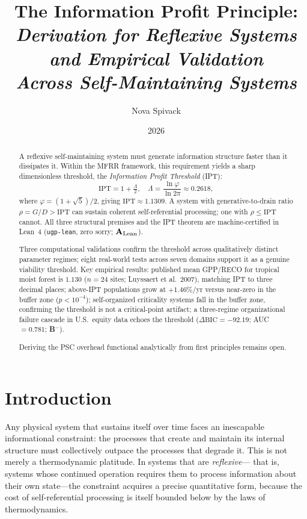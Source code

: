 \documentclass[11pt,twocolumn]{article}
\title{\bfseries The Information Profit Principle:\\
\large\itshape Derivation for Reflexive Systems and Empirical Validation\\
Across Self-Maintaining Systems}
\author{Nova Spivack}
\date{2026}
\newcommand{\CatAL}{\ensuremath{\textbf{A}_{\rm Lean}}}
\newcommand{\CatB}{\textbf{B}}
\theoremstyle{remark}
\begin{document}
\maketitle
\NovaZenodoAfterTitle

\begin{abstract}
A reflexive self-maintaining system must generate information structure faster than
it dissipates it. Within the MFRR framework, this requirement yields a sharp
dimensionless threshold, the \emph{Information Profit Threshold} (IPT):
\[
  \mathrm{IPT} = 1 + \tfrac{\Lambda}{2}, \quad
  \Lambda = \frac{\ln\varphi}{\ln 2\pi} \approx 0.2618,
\]
where $\varphi = (1+\sqrt5)/2$, giving $\mathrm{IPT} \approx 1.1309$.
A system with generative-to-drain ratio $\rho = G/D > \mathrm{IPT}$ can sustain
coherent self-referential processing; one with $\rho \leq \mathrm{IPT}$ cannot.
All three structural premises and the IPT theorem are machine-certified in Lean~4
(\texttt{ugp-lean}, zero sorry; \CatAL).

Three computational validations confirm the threshold across qualitatively distinct
parameter regimes; eight real-world tests across seven domains support it as a
genuine viability threshold. Key empirical results: published mean GPP/RECO for
tropical moist forest is $1.130$ ($n=24$ sites; Luyssaert et al.\ 2007), matching
IPT to three decimal places; above-IPT populations grow at $+1.46\%$/yr versus
near-zero in the buffer zone ($p < 10^{-4}$); self-organized criticality systems
fall in the buffer zone, confirming the threshold is not a critical-point artifact;
a three-regime organizational failure cascade in U.S.\ equity data echoes the threshold
($\Delta\mathrm{BIC} = -92.19$; AUC $= 0.781$; \CatB$^-$).

Deriving the PSC overhead functional analytically from first principles remains open.
\end{abstract}

\tableofcontents

\section{Introduction}
\label{sec:intro}

Any physical system that sustains itself over time faces an inescapable
informational constraint: the processes that create and maintain its internal
structure must collectively outpace the processes that degrade it. This is
not merely a thermodynamic platitude. In systems that are \emph{reflexive}---
that is, systems whose continued operation requires them to process information
about their own state---the constraint acquires a precise quantitative form,
because the cost of self-referential processing is itself bounded below by
the laws of thermodynamics.
\end{document}
